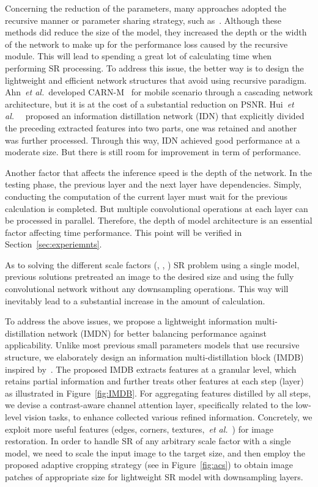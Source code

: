 \documentclass[sigconf]{acmart}
\newcommand{\etal}{\emph{et al.}~}
\begin{document}
Concerning the reduction of the parameters, many approaches adopted the recursive manner or parameter sharing strategy, such as~\cite{DRCN,DRRN,MemNet}. Although these methods did reduce the size of the model, they increased the depth or the width of the network to make up for the performance loss caused by the recursive module. This will lead to spending a great lot of calculating time when performing SR processing. To address this issue, the better way is to design the lightweight and efficient network structures that avoid using recursive paradigm. Ahn~\etal developed CARN-M~\cite{CARN} for mobile scenario through a cascading network architecture, but it is at the cost of a substantial reduction on PSNR. Hui~\etal~\cite{IDN} proposed an information distillation network (IDN) that explicitly divided the preceding extracted features into two parts, one was retained and another was further processed. Through this way, IDN achieved good performance at a moderate size. But there is still room for improvement in term of performance.

Another factor that affects the inference speed is the depth of the network. In the testing phase, the previous layer and the next layer have dependencies. Simply, conducting the computation of the current layer must wait for the previous calculation is completed. But multiple convolutional operations at each layer can be processed in parallel. Therefore, the depth of model architecture is an essential factor affecting time performance. This point will be verified in Section~\ref{sec:experiemnts}.

As to solving the different scale factors (, , ) SR problem using a single model, previous solutions pretreated an image to the desired size and using the fully convolutional network without any downsampling operations. This way will inevitably lead to a substantial increase in the amount of calculation.  

To address the above issues, we propose a lightweight information multi-distillation network (IMDN) for better balancing performance against applicability. Unlike most previous small parameters models that use recursive structure, we elaborately design an information multi-distillation block (IMDB) inspired by~\cite{IDN}. The proposed IMDB extracts features at a granular level, which retains partial information and further treats other features at each step (layer) as illustrated in Figure~\ref{fig:IMDB}. For aggregating features distilled by all steps, we devise a contrast-aware channel attention layer, specifically related to the low-level vision tasks, to enhance collected various refined information. Concretely, we exploit more useful features (edges, corners, textures,~\etal) for image restoration. In order to handle SR of any arbitrary scale factor with a single model, we need to scale the input image to the target size, and then employ the proposed adaptive cropping strategy (see in Figure~\ref{fig:acs}) to obtain image patches of appropriate size for lightweight SR model with downsampling layers.
\end{document}
